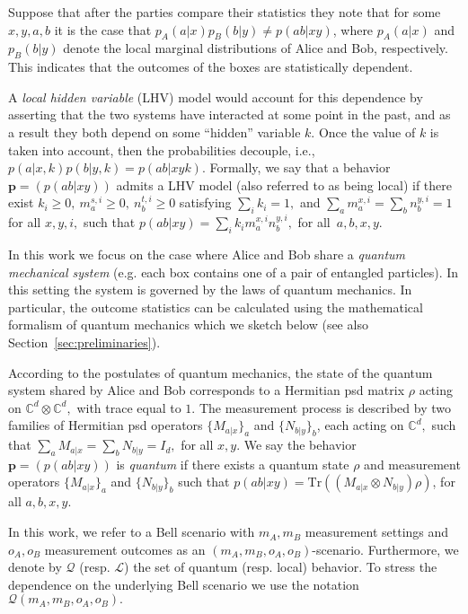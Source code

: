 \documentclass{siamart}
\begin{document}
{{{Suppose} that after the parties
compare their   statistics  they note that for some $x,y,a,b$ it is the case that
$p_A(a|x) p_B(b|y) \ne p(ab|xy)$, where $p_A(a|x)$ and
$p_B(b|y)$ denote the local marginal distributions of Alice and Bob,
respectively. This indicates  that the  outcomes  of the boxes are
statistically dependent.

A {\em local hidden variable}  (LHV)  model would  account for  this dependence by asserting    that  the two systems have interacted at some point in the past, and as a result they both depend  on some  ``hidden'' variable $k$. Once the  value of $k$ is taken into account,  then the probabilities decouple, i.e., $p(a|x,k)p(b|y,k)= p(ab|xyk)$.
Formally, we say that a behavior ${\mathbf{p}}={(p(ab|xy))}$ admits a LHV model  ({also referred to as being local}) if there exist $ k_i\ge 0, \ m_{a}^{s,i}\ge 0,\  n_{b}^{t,i}\ge 0$ satisfying  $ \sum_i k_i = 1,$  and
  $\sum_a  m_{a}^{x,i} =\sum_b n_{b}^{y,i} = 1$ for all $x,y,i,$ such that   $ p(ab|xy)=\sum_{i} k_im_a^{x,i}n_b^{y,i},$ for all~$a,b,x,y$.

In this work we focus on the  case where  Alice and Bob
share a
 {\em quantum mechanical system} (e.g. each box   contains one of a pair of entangled
particles).
In this setting   the system is governed by the laws of quantum mechanics. In particular, the  outcome statistics  can be calculated  using  the mathematical formalism of quantum mechanics which we sketch below (see also Section~\ref{sec:preliminaries}).

According to the postulates of quantum mechanics, the state of the  quantum system shared by  Alice and Bob corresponds to  a   Hermitian psd matrix $\rho$ acting on ${\mathbb{C}}^d\otimes {\mathbb{C}}^d,$ with trace equal to $1$. The  measurement process is   described  by  two families of  Hermitian psd {operators}  $\{ M_{a|x}\}_a$  and $\{ N_{b|y}\}_b$, {each} acting on ${\mathbb{C}}^d,$ such that $\sum_a M_{a|x}=\sum_bN_{b|y}=I_d,$ for all $x,y$.  We say the behavior  ${\mathbf{p}}={(p(ab|xy))}$ is {\em quantum} if there exists a quantum state $\rho$ and measurement operators $\{ M_{a|x}\}_a$  and $\{ N_{b|y}\}_b$ such that
$p(ab|xy) = {\mathrm{Tr}} \left( (M_{a|x} \otimes N_{b|y} ) \rho\right)$, for all $a,b,x,y$.

In this work, we refer to a Bell scenario with $m_A,m_B$ measurement settings and $o_A,o_B$ measurement outcomes as {an} $(m_A,m_B,o_A,o_B)$-scenario.
Furthermore, we  denote by ${\mathcal{Q}}$ (resp. ${\mathcal{L}}$) the set of  quantum (resp. local) behavior. To stress the dependence on the underlying Bell scenario  we use the notation ${\mathcal{Q}}(m_A,m_B,o_A,o_B).$

}}
\end{document}
